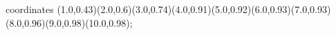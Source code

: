 					coordinates { (1.0,0.43)(2.0,0.6)(3.0,0.74)(4.0,0.91)(5.0,0.92)(6.0,0.93)(7.0,0.93)(8.0,0.96)(9.0,0.98)(10.0,0.98)};